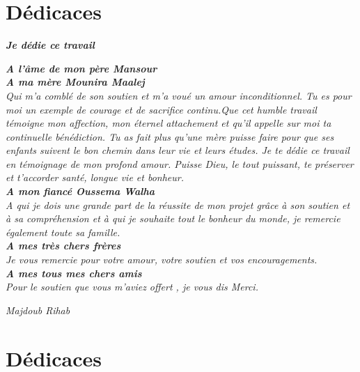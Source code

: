 \section*{Dédicaces}
\vspace{1.0in}

\begin{center}
\textit{\textsl{ \textbf{Je dédie ce travail} } }
\end{center}
\begin{center}
\textsl{
 \textbf{A l'âme de mon père Mansour}
 \\[0.2in]
 \textbf{A ma mère Mounira Maalej}\\ 
 Qui m'a comblé de son soutien et m'a 
voué un amour inconditionnel. Tu es pour moi un exemple de
courage et de sacrifice continu.Que cet humble travail témoigne
mon affection, mon éternel attachement et qu'il appelle sur moi
ta continuelle bénédiction. Tu as fait plus qu’une mère puisse faire pour que ses 
enfants suivent le bon chemin dans leur vie et leurs études. 
Je te dédie ce travail en témoignage de mon profond 
amour. Puisse Dieu, le tout puissant, te préserver et 
t’accorder santé, longue vie et bonheur.
\\[0.2in]
\textbf{A mon fiancé Oussema Walha}\\
A qui je dois une grande part de la réussite de mon projet grâce à
son soutien et à sa compréhension et à qui je souhaite tout le bonheur du monde,
je remercie également toute sa famille.
\\[0.2in]
\textbf{A mes très chers frères}\\
Je vous remercie pour votre amour, 
votre soutien et vos encouragements. 
\\[0.2in]
\textbf{A mes tous mes chers amis}\\
Pour le soutien que vous m'aviez
offert , je vous dis Merci.}
\begin{flushright}
 \textit{\emph {Majdoub Rihab}}
\end{flushright}

\end{center}

\clearpage

\section*{Dédicaces}
\vspace{1.0in}

